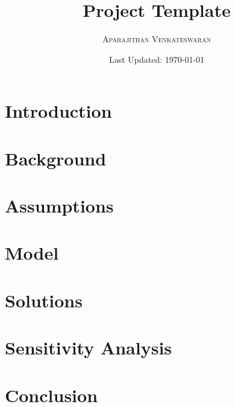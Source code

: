 \documentclass[12pt]{article}
\title{Project Template\\} %
\author{%
	\textsc{Aparajithan Venkateswaran} \\[1ex] %
}
\date{Last Updated: \today}
\begin{document}
\maketitle
\thispagestyle{empty}


\section{Introduction}
\label{section:introduction}



\section{Background}
\label{section:background}



\section{Assumptions}
\label{section:assumptions}



\section{Model}
\label{section:model}



\section{Solutions}
\label{section:solutions}



\section{Sensitivity Analysis}
\label{section:sensitivity}



\section{Conclusion}
\label{section:conclusion}


%
%

\newpage
\nocite{*}



%
%

\newpage
\appendix



	
\end{document}
